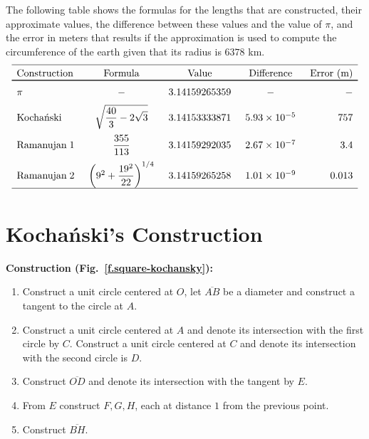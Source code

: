 \enlargethispage{\baselineskip}

The following table shows the formulas for the lengths that are constructed, their approximate values, the difference between these values and the value of $\pi$, and the error in meters that results if the approximation is used to compute the circumference of the earth given that its radius is $6378$ km.
\[
\begin{array}{l@{\hspace{5mm}}c@{\hspace{5mm}}c@{\hspace{5mm}}c@{\hspace{5mm}}r}
\hline\noalign{\smallskip}
\textrm{Construction} & \textrm{Formula} &\textrm{Value} & \textrm{Difference} & \textrm{Error (m)}\\\svhline\noalign{\medskip}
\pi & -& 3.14159265359 & - & -\\\noalign{\medskip}
\textrm{Kocha\'{n}ski} & \sqrt{\displaystyle\frac{40}{3}-2\sqrt{3}}&
  3.14153333871 & 5.93 \times 10^{-5} & 757\\\noalign{\medskip}
\textrm{Ramanujan}\; 1 & \displaystyle\frac{355}{113} &
  3.14159292035 &2.67  \times 10^{-7}&3.4\\\noalign{\medskip}
\textrm{Ramanujan}\; 2 &\left(9^2+\displaystyle\frac{19^2}{22}\right)^{1/4}&
  3.14159265258 & 1.01 \times 10^{-9}& 0.013\\
\hline\noalign{\smallskip}
\end{array}
\]


\section{Kocha\'{n}ski's Construction}\label{s.square-kochanski}
\textbf{Construction (Fig.~\ref{f.square-kochansky}):}
\begin{enumerate}
\item Construct a unit circle centered at $O$, let $\overline{AB}$ be a diameter and construct a tangent to the circle at $A$.
\item Construct a unit circle centered at $A$ and denote its intersection with the first circle by $C$. Construct a unit circle centered at $C$ and denote its intersection with the second circle is $D$. 
\item Construct $\overline{OD}$ and denote its intersection with the tangent by $E$.
\item From $E$ construct $F,G,H$, each at distance $1$ from the previous point.
\item Construct $\overline{BH}$.
\end{enumerate}

